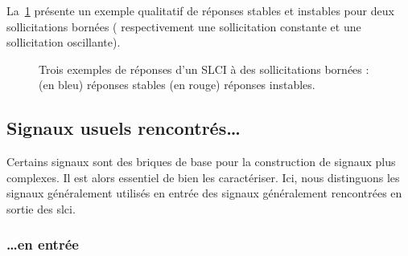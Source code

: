 La~\cref{fig-stabilite_signaux} présente un exemple qualitatif de réponses 
stables et instables pour deux sollicitations bornées ( respectivement une 
sollicitation constante et une sollicitation oscillante).
\begin{figure}[!ht]
    \centering
    
    
    

    
    
    
    \caption{Trois exemples de réponses d'un SLCI à des sollicitations bornées :
            (en bleu)  réponses stables 
            (en rouge) réponses instables.\label{fig-stabilite_signaux}}
\end{figure}
\newpage
{}
\subsection{Signaux usuels rencontrés\ldots\label{sec-signaux_usuels}}
Certains signaux sont des briques de base pour la construction de
signaux plus complexes. Il est alors essentiel de bien les caractériser.
Ici, nous distinguons les signaux généralement utilisés en 
entrée des signaux généralement rencontrées en sortie des \gls{slci}.
\subsubsection{\ldots en entrée}
